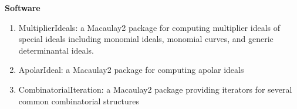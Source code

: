 \documentclass[12pt]{article}
\begin{document}
\textbf{Software}
\begin{enumerate}

\item MultiplierIdeals:
a Macaulay2 package for computing multiplier ideals of special ideals including monomial ideals, monomial curves, and generic determinantal ideals.

\item ApolarIdeal:
a Macaulay2 package for computing apolar ideals

\item CombinatorialIteration:
a Macaulay2 package providing iterators for several common combinatorial structures

\end{enumerate}


%
%




\end{document}
